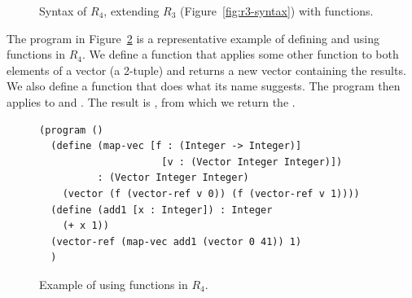 \documentclass[11pt]{book}
\newcommand{\gray}[1]{{\color{gray} #1}}
\begin{document}
\begin{figure}[tp]
\centering
\fbox{
\begin{minipage}{0.96\textwidth}
\[
\begin{array}{lcl}
  \Type &::=& \gray{ \key{Integer} \mid \key{Boolean}
         \mid (\key{Vector}\;\Type^{+}) \mid \key{Void}  } \mid (\Type^{*} \; \key{->}\; \Type) \\
\itm{cmp} &::= & \gray{  \key{eq?} \mid \key{<} \mid \key{<=} \mid \key{>} \mid \key{>=}  } \\
  \Exp &::=& \gray{ \Int \mid (\key{read}) \mid (\key{-}\;\Exp) \mid (\key{+} \; \Exp\;\Exp) \mid (\key{-}\;\Exp\;\Exp)}  \\
    &\mid&  \gray{ \Var \mid \LET{\Var}{\Exp}{\Exp} }\\
    &\mid& \gray{ \key{\#t} \mid \key{\#f} 
    \mid (\key{and}\;\Exp\;\Exp)
    \mid (\key{or}\;\Exp\;\Exp)
    \mid (\key{not}\;\Exp)} \\
   &\mid& \gray{(\itm{cmp}\;\Exp\;\Exp) \mid \IF{\Exp}{\Exp}{\Exp}} \\
  &\mid& \gray{(\key{vector}\;\Exp^{+}) \mid
    (\key{vector-ref}\;\Exp\;\Int)} \\
  &\mid& \gray{(\key{vector-set!}\;\Exp\;\Int\;\Exp)\mid (\key{void})} \\
      &\mid& (\Exp \; \Exp^{*}) \\
  \Def &::=& (\key{define}\; (\Var \; [\Var \key{:} \Type]^{*}) \key{:} \Type \; \Exp) \\
  R_4 &::=& (\key{program} \;\itm{info}\; \Def^{*} \; \Exp)
\end{array}
\]
\end{minipage}
}
\caption{Syntax of $R_4$, extending $R_3$ (Figure~\ref{fig:r3-syntax})
  with functions.}
\label{fig:r4-syntax}
\end{figure}

The program in Figure~\ref{fig:r4-function-example} is a
representative example of defining and using functions in $R_4$.  We
define a function  that applies some other function
 to both elements of a vector (a 2-tuple) and returns a new
vector containing the results. We also define a function 
that does what its name suggests. The program then applies
 to  and .  The result is
, from which we return the .

\begin{figure}[tbp]
\begin{lstlisting}
(program ()
  (define (map-vec [f : (Integer -> Integer)]
                     [v : (Vector Integer Integer)])
          : (Vector Integer Integer)
    (vector (f (vector-ref v 0)) (f (vector-ref v 1))))
  (define (add1 [x : Integer]) : Integer
    (+ x 1))
  (vector-ref (map-vec add1 (vector 0 41)) 1)
  )
\end{lstlisting}
\caption{Example of using functions in $R_4$.}
\label{fig:r4-function-example}
\end{figure}
\end{document}
